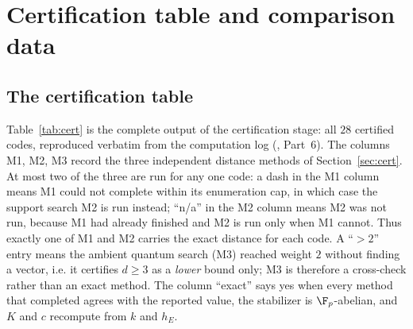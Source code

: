 \appendix
\section{Certification table and comparison data}
\label{app:tables}

\subsection{The certification table}

Table~\ref{tab:cert} is the complete output of the certification stage: all
$28$ certified codes, reproduced verbatim from the computation log
(, Part~6). The
columns M1, M2, M3 record the three independent distance methods of
Section~\ref{sec:cert}. At most two of the three are run for any one code:
a dash in the M1 column means M1 could not complete within its enumeration
cap, in which case the support search M2 is run instead; ``n/a'' in the M2
column means M2 was not run, because M1 had already finished and M2 is run
only when M1 cannot. Thus exactly one of M1 and M2 carries the exact distance
for each code. A ``$>2$'' entry means the ambient quantum search
(M3) reached weight $2$ without finding a vector, i.e. it certifies $d\ge3$ as
a \emph{lower} bound only; M3 is therefore a cross-check rather than an exact
method. The column ``exact'' says yes when every method that completed agrees
with the reported value, the stabilizer is $\F_p$-abelian, and $K$ and $c$
recompute from $k$ and $h_E$.

